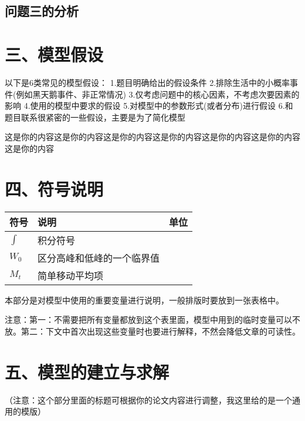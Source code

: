 \documentclass{my_paper}
\begin{document}
\subsection{问题三的分析}


\section{三、模型假设}
以下是6类常见的模型假设：
1.题目明确给出的假设条件
2.排除生活中的小概率事件(例如黑天鹅事件、非正常情况)
3.仅考虑问题中的核心因素，不考虑次要因素的影响
4.使用的模型中要求的假设
5.对模型中的参数形式(或者分布)进行假设
6.和题目联系很紧密的一些假设，主要是为了简化模型

这是你的内容这是你的内容这是你的内容这是你的内容这是你的内容这是你的内容这是你的内容


\section{四、符号说明}
\begin{table}[h]%
    \centering
    \begin{tabular}{p{2.0cm}<{\centering}p{9.0cm}<{\centering}p{2.0cm}<{\centering}}
    \hline
    符号 & 说明 & 单位 \\ %
    \hline
    $\int$ & 积分符号 &  \\ %
    $W_0$ & 区分高峰和低峰的一个临界值 &  \\ %
    $M_t$ &  简单移动平均项 &  \\ %
    \hline
    \end{tabular}
\end{table}
本部分是对模型中使用的重要变量进行说明，一般排版时要放到一张表格中。

注意：第一：不需要把所有变量都放到这个表里面，模型中用到的临时变量可以不放。第二：下文中首次出现这些变量时也要进行解释，不然会降低文章的可读性。

\section{五、模型的建立与求解}

（注意：这个部分里面的标题可根据你的论文内容进行调整，我这里给的是一个通用的模版）
\end{document}
